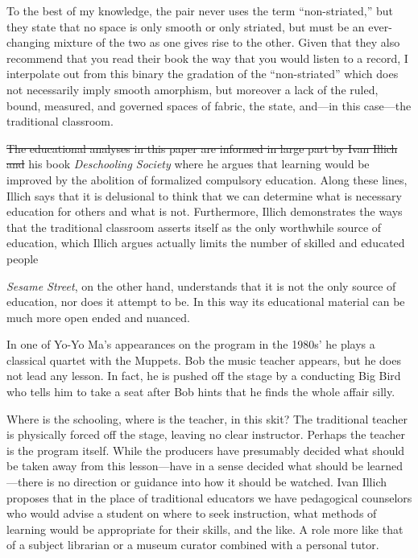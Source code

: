 \documentclass[12pt,letterpaper]{article}
\providecommand{\DIFadd}[1]{{\protect\color{blue}\uwave{#1}}} %
\providecommand{\DIFdel}[1]{{\protect\color{red}\sout{#1}}}                      %
\providecommand{\DIFaddbegin}{} %
\providecommand{\DIFaddend}{} %
\providecommand{\DIFdelbegin}{} %
\providecommand{\DIFdelend}{} %
\newcommand{\DIFscaledelfig}{0.5}
\newlength{\DIFdelgraphicswidth} %
\newlength{\DIFdelgraphicsheight} %
\newcommand{\DIFaddincludegraphics}[2][]{{\color{blue}\fbox{\DIFOincludegraphics[#1]{#2}}}} %
\newcommand{\DIFdelincludegraphics}[2][]{%
\sbox{\DIFdelgraphicsbox}{\DIFOincludegraphics[#1]{#2}}%
\settoboxwidth{\DIFdelgraphicswidth}{\DIFdelgraphicsbox} %
\settoboxtotalheight{\DIFdelgraphicsheight}{\DIFdelgraphicsbox} %
\scalebox{\DIFscaledelfig}{%
\parbox[b]{\DIFdelgraphicswidth}{\usebox{\DIFdelgraphicsbox}\\[-\baselineskip] \rule{\DIFdelgraphicswidth}{0em}}\llap{\resizebox{\DIFdelgraphicswidth}{\DIFdelgraphicsheight}{%
\setlength{\unitlength}{\DIFdelgraphicswidth}%
\begin{picture}(1,1)%
\thicklines\linethickness{2pt} %
{\color[rgb]{1,0,0}\put(0,0){\framebox(1,1){}}}%
{\color[rgb]{1,0,0}\put(0,0){\line( 1,1){1}}}%
{\color[rgb]{1,0,0}\put(0,1){\line(1,-1){1}}}%
\end{picture}%
}\hspace*{3pt}}} %
} %
\DeclareRobustCommand{\DIFaddbegin}{\DIFOaddbegin \let\includegraphics\DIFaddincludegraphics} %
\DeclareRobustCommand{\DIFaddend}{\DIFOaddend \let\includegraphics\DIFOincludegraphics} %
\DeclareRobustCommand{\DIFdelbegin}{\DIFOdelbegin \let\includegraphics\DIFdelincludegraphics} %
\DeclareRobustCommand{\DIFdelend}{\DIFOaddend \let\includegraphics\DIFOincludegraphics} %
\begin{document}
	To the best of my knowledge, the pair never uses the term 
	``non-striated,'' but they state that no space is only smooth or 
	only striated, but must be an ever-changing mixture of the two as one 
	gives rise to the other.\autocite[474]{Deleuze} Given that they also 
	recommend that you read their book the way that you would listen to a 
	record,\autocite[ix]{Deleuze} I interpolate out from this binary the 
	gradation of the ``non-striated'' which does not necessarily 
	imply smooth amorphism, but moreover a lack of the ruled, bound, 
	measured, and governed spaces of fabric, the state, and---in this 
	case---the traditional classroom.       

	\DIFdelbegin \DIFdel{The educational analyses in this paper are informed in large part by 
	Ivan Illich and }\DIFdelend \DIFaddbegin \DIFadd{Ivan Illich problematizes the striated classroom in }\DIFaddend his book
	\textit{Deschooling Society} where he argues
	that learning would be improved by the abolition of formalized
	compulsory education. Along these lines, Illich says that it is 
	delusional to think that we can determine what is necessary education 
	for others and what is not.\autocite[12]{Illich} Furthermore, Illich 
	demonstrates the ways that the traditional classroom asserts itself as
	the only worthwhile source of education, which Illich argues actually 
	limits the number of skilled and educated people\autocite[39]{Illich} 

	\textit{Sesame Street}, on the other hand, understands that it is not 
	the only source of education, nor does it attempt to be. In this way its
	educational material can be much more open ended and nuanced. 

	In one of Yo-Yo Ma's appearances on the program in the 1980s' he plays
	a classical quartet with the Muppets. Bob the music teacher appears, 
	but he does not lead any lesson. In fact, he is pushed off the stage by 
	a conducting Big Bird who tells him to take a seat after Bob hints that
	he finds the whole affair silly.

	Where is the schooling, where is the teacher, in this skit? The 
	traditional teacher is physically forced off the stage, leaving no clear
	instructor.  Perhaps the teacher is the program itself.  While the 
	producers have presumably decided what should be taken away from this 
	lesson---have in a sense decided what should be learned---there is no 
	direction or guidance into how it should be watched. Ivan Illich
	proposes that in the place of traditional educators we have
	pedagogical counselors who would advise a student on where to seek 
	instruction, what methods of learning would be appropriate for their 
	skills, and the like. A role more like that of a subject librarian or a 
	museum curator combined with a personal tutor.\autocite[43]{Illich}
\end{document}
